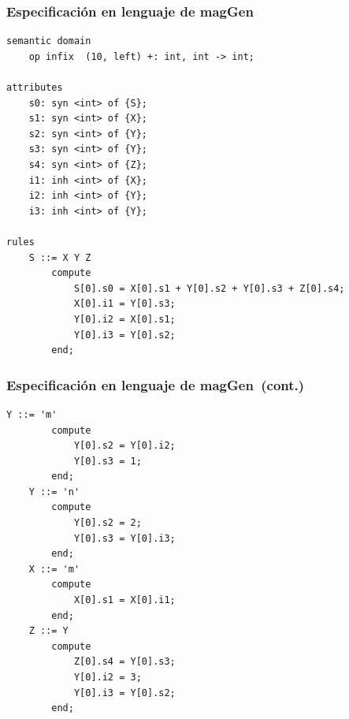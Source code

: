 \documentclass[10pt]{beamer}
\newcommand{\maggen}{\textbf{magGen}}
\begin{document}
\begin{frame}[fragile]
\frametitle{Especificación en lenguaje de \maggen}

\begin{lstlisting}[basicstyle=\scriptsize, language=specmag, linewidth=10cm]
semantic domain
    op infix  (10, left) +: int, int -> int;

attributes
    s0: syn <int> of {S};
    s1: syn <int> of {X};
    s2: syn <int> of {Y};
    s3: syn <int> of {Y};
    s4: syn <int> of {Z};
    i1: inh <int> of {X};
    i2: inh <int> of {Y};
    i3: inh <int> of {Y};

rules
    S ::= X Y Z
        compute
            S[0].s0 = X[0].s1 + Y[0].s2 + Y[0].s3 + Z[0].s4;
            X[0].i1 = Y[0].s3;
            Y[0].i2 = X[0].s1;
            Y[0].i3 = Y[0].s2;
        end;
\end{lstlisting}
\end{frame}

\begin{frame}[fragile]
\frametitle{Especificación en lenguaje de \maggen\ (cont.)}

\begin{lstlisting}[basicstyle=\scriptsize, language=specmag, linewidth=10cm]
    Y ::= 'm'
        compute
            Y[0].s2 = Y[0].i2;
            Y[0].s3 = 1;
        end;
    Y ::= 'n'
        compute
            Y[0].s2 = 2;
            Y[0].s3 = Y[0].i3;
        end;
    X ::= 'm'
        compute
            X[0].s1 = X[0].i1;
        end;
    Z ::= Y
        compute
            Z[0].s4 = Y[0].s3;
            Y[0].i2 = 3;
            Y[0].i3 = Y[0].s2;
        end;


\end{lstlisting}

\end{frame}
\end{document}
